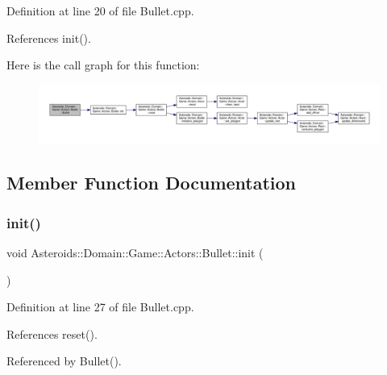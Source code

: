 Definition at line 20 of file Bullet.\+cpp.



References init().

Here is the call graph for this function\+:\nopagebreak
\begin{figure}[H]
\begin{center}
\leavevmode
\includegraphics[width=350pt]{classAsteroids_1_1Domain_1_1Game_1_1Actors_1_1Bullet_a48557011de2d1939a8b5f7fe7e9fccda_cgraph}
\end{center}
\end{figure}


\subsection{Member Function Documentation}
\mbox{\label{classAsteroids_1_1Domain_1_1Game_1_1Actors_1_1Bullet_a1c7b384d298439c581d97f996f067985}} 
\subsubsection{\texorpdfstring{init()}{init()}}
{\footnotesize\ttfamily void Asteroids\+::\+Domain\+::\+Game\+::\+Actors\+::\+Bullet\+::init (\begin{DoxyParamCaption}{ }\end{DoxyParamCaption})\hspace{0.3cm}{\ttfamily [private]}}



Definition at line 27 of file Bullet.\+cpp.



References reset().



Referenced by Bullet().

